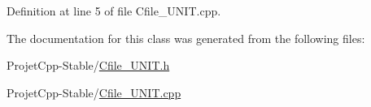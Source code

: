 Definition at line 5 of file Cfile\+\_\+\+U\+N\+I\+T.\+cpp.



The documentation for this class was generated from the following files\+:\begin{DoxyCompactItemize}
\item 
Projet\+Cpp-\/\+Stable/\hyperlink{_cfile___u_n_i_t_8h}{Cfile\+\_\+\+U\+N\+I\+T.\+h}\item 
Projet\+Cpp-\/\+Stable/\hyperlink{_cfile___u_n_i_t_8cpp}{Cfile\+\_\+\+U\+N\+I\+T.\+cpp}\end{DoxyCompactItemize}
